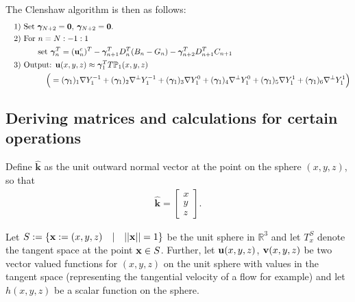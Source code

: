 \documentclass[11pt, oneside]{article}   	%
\newcommand{\R}{\mathbb{R}}
\newcommand{\gradP}{T\mathbb{P}}
\newcommand{\gradY}{\nabla Y}
\newcommand{\gradpY}{\nabla^\perp Y}
\newcommand{\unitvec}{\hat{\bm{k}}}
\begin{document}
The Clenshaw algorithm is then as follows:
\begin{align*}
\quad &\text{1) } \text{Set } \bm{\gamma}_{N+2} = \bold{0}, \: \bm{\gamma}_{N+2} = \bold{0}. \\
\quad &\text{2) } \text{For } n = N:-1:1 \\
\quad & \quad \quad \quad \text{set } \bm{\gamma}_{n}^T = (\mathbf{u}^c_n)^T - \bm{\gamma}_{n+1}^T D^T_n (B_n - G_n) -  \bm{\gamma}_{n+2}^T D^T_{n+1}C_{n+1} \\
\quad &\text{3) } \text{Output: } \mathbf{u}(x,y,z) \approx \bm{\gamma}_{1}^T \gradP_1(x,y,z) \\
&\quad \quad \quad \quad \Big( = (\bm{\gamma}_{1})_1 \gradY_1^{-1} + (\bm{\gamma}_{1})_2 \gradpY_1^{-1} + (\bm{\gamma}_{1})_3 \gradY_1^{0} + (\bm{\gamma}_{1})_4 \gradpY_1^{0} + (\bm{\gamma}_{1})_5 \gradY_1^{1} + (\bm{\gamma}_{1})_6 \gradpY_1^{1} \Big)
\end{align*}




\subsection{Deriving matrices and calculations for certain operations}

Define \(\unitvec\) as the unit outward normal vector at the point on the sphere \((x,y,z)\), so that
\begin{align}
\unitvec = \begin{bmatrix} x \\ y \\ z \end{bmatrix}.
\end{align}

Let \(S := \{ \bold{x} := (x,y,z) \quad | \quad ||\bold{x}|| = 1\}\) be the unit sphere in \(\R^3\) and let \(T_x^S\) denote the tangent space at the point \(\bold{x} \in S\). Further, let \(\bold{u}(x,y,z)\), \(\bold{v}(x,y,z)\) be two vector valued functions for \((x,y,z)\) on the unit sphere with values in the tangent space (representing the tangential velocity of a flow for example) and let \(h(x,y,z)\) be a scalar function on the sphere.
\end{document}
